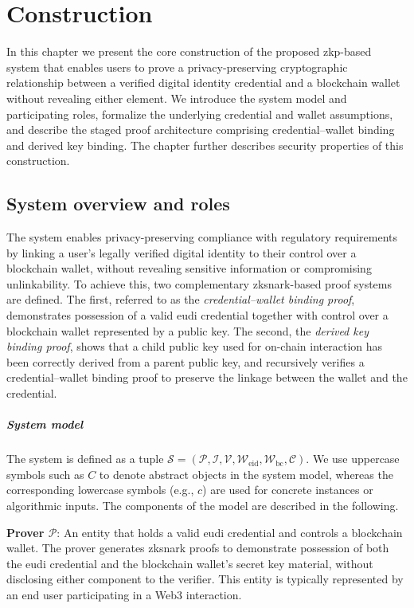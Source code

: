 \chapter{Construction}
\label{chap:construction}
In this chapter we present the core construction of the proposed \acrshort{zkp}-based system that enables users to prove a privacy-preserving cryptographic relationship between a verified digital identity credential and a blockchain wallet without revealing either element. We introduce the system model and participating roles, formalize the underlying credential and wallet assumptions, and describe the staged proof architecture comprising credential–wallet binding and derived key binding. The chapter further describes security properties of this construction.

\section{System overview and roles}
\label{sec:system-overview}

The system enables privacy-preserving compliance with regulatory requirements by linking a user's legally verified digital identity to their control over a blockchain wallet, without revealing sensitive information or compromising unlinkability. To achieve this, two complementary \acrshort{zksnark}-based proof systems are defined. The first, referred to as the \textit{credential–wallet binding proof}, demonstrates possession of a valid \acrshort{eudi} credential together with control over a blockchain wallet represented by a public key. The second, the \textit{derived key binding proof}, shows that a child public key used for on-chain interaction has been correctly derived from a parent public key, and recursively verifies a credential–wallet binding proof to preserve the linkage between the wallet and the credential.

\paragraph{System model}
The system is defined as a tuple $\mathcal{S} = (\mathcal{P}, \mathcal{I}, \mathcal{V}, \mathcal{W}_{\text{eid}}, \mathcal{W}_{\text{bc}}, \mathcal{C})$. We use uppercase symbols such as $C$ to denote abstract objects in the system model, whereas the corresponding lowercase symbols (e.g., $c$) are used for concrete instances or algorithmic inputs. The components of the model are described in the following.

\medskip
\textbf{Prover $\mathcal{P}$}: An entity that holds a valid \acrshort{eudi} credential and controls a blockchain wallet. The prover generates \acrshort{zksnark} proofs to demonstrate possession of both the \acrshort{eudi} credential and the blockchain wallet’s secret key material, without disclosing either component to the verifier. This entity is typically represented by an end user participating in a Web3 interaction.


